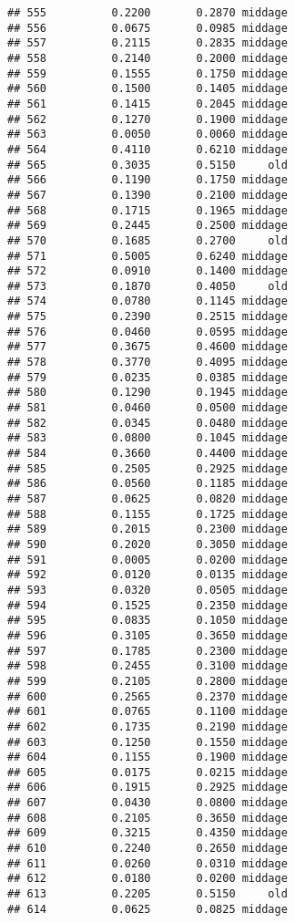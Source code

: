\documentclass[
]{article}
\begin{document}
\begin{verbatim}
## 555          0.2200       0.2870 middage
## 556          0.0675       0.0985 middage
## 557          0.2115       0.2835 middage
## 558          0.2140       0.2000 middage
## 559          0.1555       0.1750 middage
## 560          0.1500       0.1405 middage
## 561          0.1415       0.2045 middage
## 562          0.1270       0.1900 middage
## 563          0.0050       0.0060 middage
## 564          0.4110       0.6210 middage
## 565          0.3035       0.5150     old
## 566          0.1190       0.1750 middage
## 567          0.1390       0.2100 middage
## 568          0.1715       0.1965 middage
## 569          0.2445       0.2500 middage
## 570          0.1685       0.2700     old
## 571          0.5005       0.6240 middage
## 572          0.0910       0.1400 middage
## 573          0.1870       0.4050     old
## 574          0.0780       0.1145 middage
## 575          0.2390       0.2515 middage
## 576          0.0460       0.0595 middage
## 577          0.3675       0.4600 middage
## 578          0.3770       0.4095 middage
## 579          0.0235       0.0385 middage
## 580          0.1290       0.1945 middage
## 581          0.0460       0.0500 middage
## 582          0.0345       0.0480 middage
## 583          0.0800       0.1045 middage
## 584          0.3660       0.4400 middage
## 585          0.2505       0.2925 middage
## 586          0.0560       0.1185 middage
## 587          0.0625       0.0820 middage
## 588          0.1155       0.1725 middage
## 589          0.2015       0.2300 middage
## 590          0.2020       0.3050 middage
## 591          0.0005       0.0200 middage
## 592          0.0120       0.0135 middage
## 593          0.0320       0.0505 middage
## 594          0.1525       0.2350 middage
## 595          0.0835       0.1050 middage
## 596          0.3105       0.3650 middage
## 597          0.1785       0.2300 middage
## 598          0.2455       0.3100 middage
## 599          0.2105       0.2800 middage
## 600          0.2565       0.2370 middage
## 601          0.0765       0.1100 middage
## 602          0.1735       0.2190 middage
## 603          0.1250       0.1550 middage
## 604          0.1155       0.1900 middage
## 605          0.0175       0.0215 middage
## 606          0.1915       0.2925 middage
## 607          0.0430       0.0800 middage
## 608          0.2105       0.3650 middage
## 609          0.3215       0.4350 middage
## 610          0.2240       0.2650 middage
## 611          0.0260       0.0310 middage
## 612          0.0180       0.0200 middage
## 613          0.2205       0.5150     old
## 614          0.0625       0.0825 middage

\end{verbatim}
\end{document}
